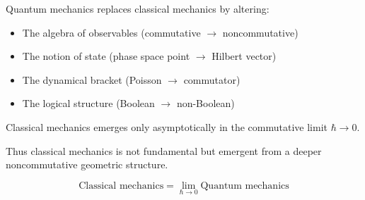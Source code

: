 \documentclass[11pt,a4paper]{article}
\begin{document}
Quantum mechanics replaces classical mechanics by altering:

\begin{itemize}
\item The algebra of observables (commutative $\to$ noncommutative)
\item The notion of state (phase space point $\to$ Hilbert vector)
\item The dynamical bracket (Poisson $\to$ commutator)
\item The logical structure (Boolean $\to$ non-Boolean)
\end{itemize}

Classical mechanics emerges only asymptotically in the commutative limit $\hbar \to 0$.

Thus classical mechanics is not fundamental but emergent from a deeper noncommutative geometric structure.

\[
\boxed{
\text{Classical mechanics} = \lim_{\hbar\to0} \text{Quantum mechanics}
}
\]
\end{document}
